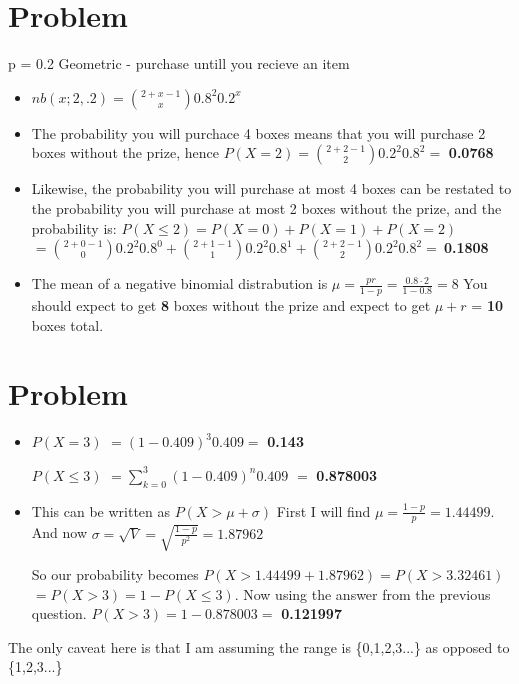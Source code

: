 \documentclass[12pt, letterpaper]{article}
\begin{document}
\section{Problem}
p = 0.2
Geometric - purchase untill you recieve an item
\begin{itemize}
	\item $nb(x; 2, .2) = \binom{2+x-1}{x}0.8^{2}0.2^{x}$
	\item The probability you will purchace 4 boxes means that you will purchase 2 boxes without the prize, hence
	$P(X = 2) = \binom{2+2-1}{2}0.2^{2}0.8^{2} =$ \textbf{0.0768}
	\item Likewise, the probability you will purchase at most 4 boxes can be restated to the probability you will purchase at most 2 boxes without the prize, and the probability is:
	$P(X \le 2) = P(X = 0) + P(X = 1) + P(X = 2)$
	$ = \binom{2+0-1}{0}0.2^{2}0.8^{0} + \binom{2+1-1}{1}0.2^{2}0.8^{1} + \binom{2+2-1}{2}0.2^{2}0.8^{2} =\ $\textbf{0.1808}
	\item The mean of a negative binomial distrabution is 
	$\mu = \frac{pr}{1-p} = \frac{0.8\cdot 2}{1-0.8} = 8$
	You should expect to get \textbf{8} boxes without the prize and expect to get $\mu + r$ = \textbf{10} boxes total.
\end{itemize}
\section{Problem}
\begin{itemize}
	\item $P(X = 3) $
	$ = (1-0.409)^{3}0.409 = $ \textbf{0.143}

	$P(X \le 3) $
	$ = \sum_{k=0}^{3} (1-0.409)^{n}0.409 $
	$ = $ \textbf{0.878003}

	\item This can be written as $P(X > \mu + \sigma)$
	First I will find $\mu = \frac{1-p}{p} = 1.44499$. And now
	$\sigma = \sqrt{V} = \sqrt{\frac{1-p}{p^2}} = 1.87962$

	So our probability becomes $P(X > 1.44499+1.87962) = P(X > 3.32461)$
	$ = P(X > 3) = 1 - P(X \le 3)$. Now using the answer from the previous question.
	$P(X > 3) = 1 - 0.878003 = $ \textbf{0.121997}
\end{itemize}
The only caveat here is that I am assuming the range is \{0,1,2,3...\} as opposed to \{1,2,3...\}
\end{document}
